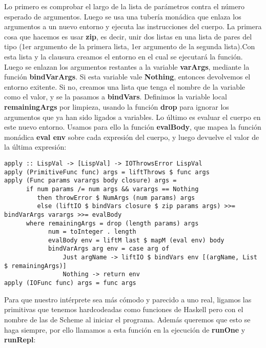 Lo primero es comprobar el largo de la lista de par\'ametros contra el n\'umero esperado de argumentos. Luego se usa una tuber\'ia mon\'adica que enlaza los argumentos a un nuevo entorno y ejecuta las instrucciones del cuerpo. La primera cosa que hacemos es usar \textbf{zip}, es decir, unir dos listas en una lista de pares del tipo (1er argumento de la primera lista, 1er argumento de la segunda lista).Con esta lista y la clausura creamos el entorno en el cual se ejecutar\'a la funci\'on. Luego se enlazan los argumentos restantes a la variable \textbf{varArgs}, mediante la funci\'on \textbf{bindVarArgs}. Si esta variable vale \textbf{Nothing}, entonces devolvemos el entorno exitente. Si no, creamos una lista que tenga el nombre de la variable como el valor, y se la pasamos a \textbf{bindVars}. Definimos la variable local \textbf{remainingArgs} por limpieza, usando la funci\'on \textbf{drop} para ignorar los argumentos que ya han sido ligados a variables. Lo \'ultimo es evaluar el cuerpo en este nuevo entorno. Usamos para ello la funci\'on \textbf{evalBody}, que mapea la funci\'on mon\'adica \textbf{eval env} sobre cada expresi\'on del cuerpo, y luego devuelve el valor de la \'ultima expresi\'on:

\begin{minipage}{\linewidth}
\begin{tiny}
\begin{lstlisting}[frame=single]
apply :: LispVal -> [LispVal] -> IOThrowsError LispVal
apply (PrimitiveFunc func) args = liftThrows $ func args
apply (Func params varargs body closure) args =
      if num params /= num args && varargs == Nothing
         then throwError $ NumArgs (num params) args
         else (liftIO $ bindVars closure $ zip params args) >>= bindVarArgs varargs >>= evalBody
      where remainingArgs = drop (length params) args
            num = toInteger . length
            evalBody env = liftM last $ mapM (eval env) body
            bindVarArgs arg env = case arg of
                Just argName -> liftIO $ bindVars env [(argName, List $ remainingArgs)]
                Nothing -> return env
apply (IOFunc func) args = func args
\end{lstlisting}
\end{tiny}
\end{minipage}

Para que nuestro int\'erprete sea m\'as c\'omodo y parecido a uno real, ligamos las primitivas que tenemos hardcodeadas como funciones de Haskell pero con el nombre de las de Scheme al iniciar el programa. Adem\'as queremos que esto se haga siempre, por ello llamamos a esta funci\'on en la ejecuci\'on de \textbf{runOne} y \textbf{runRepl}:\\

